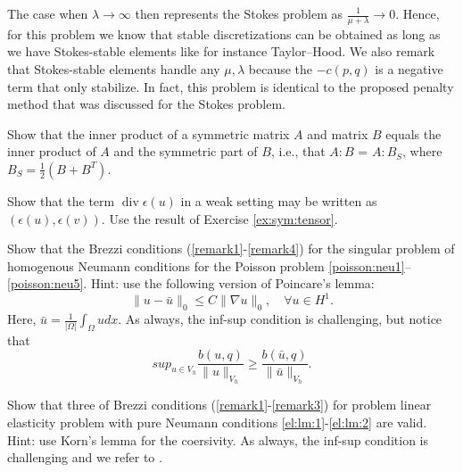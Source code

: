 The case when $\lambda\rightarrow\infty$ then represents the Stokes
problem as $\frac{1}{\mu + \lambda}\rightarrow 0$. Hence, for this
problem we know that stable discretizations can be obtained
as long as we have Stokes-stable elements like for instance Taylor--Hood.
We also remark that Stokes-stable elements handle any $\mu, \lambda$
because the $-c(p,q)$ is a negative term that only stabilize.
In fact, this problem is identical to the proposed penalty
method that was discussed for the Stokes problem. 



\begin{exercise}
\label{ex:sym:tensor}
Show that the inner product of a symmetric matrix $A$ and matrix $B$ equals
the inner product of $A$ and the symmetric part of $B$, i.e., that
$A:B$ = $A:B_S$, where $B_S = \frac{1}{2} (B + B^T)$. 
\end{exercise}

\begin{exercise}
Show that the term $\operatorname{div} \epsilon(u)$ in a weak setting may be written as $(\epsilon(u), \epsilon(v))$. Use the result of Exercise \ref{ex:sym:tensor}.   
\end{exercise}

\begin{exercise}
\label{ex:poissonbrezzi}
Show that the Brezzi conditions (\ref{remark1}-\ref{remark4}) for the singular problem of homogenous Neumann conditions for the Poisson problem \eqref{poisson:neu1}--\eqref{poisson:neu5}. Hint: use the following version of Poincare's lemma: 
\[
\|u-\bar{u}\|_0 \le C \|\nabla u \|_0, \quad \forall u \in H^1 .  
\]
Here, $\bar{u}=\frac{1}{|\Omega|}\int_\Omega u dx$. 
As always, the inf-sup condition is challenging, but notice that
\[
sup_{u\in V_h} \frac{b(u,q)}{\|u\|_{V_h}} \ge \frac{b(\bar{u},q)}{\|\bar{u}\|_{V_h}} .  
\]
\end{exercise}



\begin{exercise}
\label{ex:kornbrezzi}
Show that three of Brezzi conditions (\ref{remark1}-\ref{remark3}) for problem linear elasticity problem with pure Neumann conditions \eqref{el:lm:1}-\eqref{el:lm:2} are valid. Hint: use Korn's lemma for the coersivity.
As always, the inf-sup condition is challenging and we refer to \cite{kuchta2016singular}.
\end{exercise}

